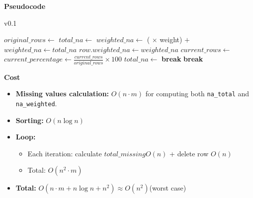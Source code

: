 \documentclass[a4paper,12pt]{article}
\begin{document}
\textbf{Pseudocode}
\begin{algorithm}[H]
\caption{v0.1}
\begin{algorithmic}[1]
    \State $original\_rows \gets$ 
        \State $total\_na \gets$ 
            \State $weighted\_na \gets$ ( $\times$ weight) $+$ 
        \Else
            \State $weighted\_na \gets total\_na$
        \EndIf
        \State $row.weighted\_na \gets weighted\_na$
    \EndFor
    \State {}
        \State $current\_rows \gets$ 
        \State $current\_percentage \gets \frac{current\_rows}{original\_rows} \times 100$
        \State $total\_na \gets$ 
            \State \textbf{break}
        \EndIf
            \State \textbf{break}
        \EndIf
        \State {}
    \EndWhile
    \State {}
\EndFunction
\end{algorithmic}
\end{algorithm}

\textbf{Cost}
\begin{itemize}
    \item \textbf{Missing values calculation:} $O(n \cdot m)$ for computing both \texttt{na\_total} and \texttt{na\_weighted}.
    \item \textbf{Sorting:} $O(n \log n)$
    \item \textbf{Loop:} 
        \begin{itemize}
            \item Each iteration: calculate $total\_missing O(n)$ + delete row $O(n)$
            \item Total: $O(n^2 \cdot m)$
        \end{itemize}
    \item \textbf{Total:} $O(n \cdot m + n \log n + n^2) \approx O(n^2)$(worst case)
\end{itemize}

\end{document}
